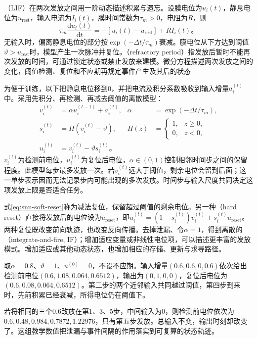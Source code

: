 （LIF）在两次发放之间用一阶动态描述积累与遗忘。设膜电位为$u_i(t)$，静息电位为$u_{\mathrm{rest}}$，输入电流为$I_i(t)$，膜时间常数为$\tau_m>0$，电阻为$R$，则
\begin{equation}
  \tau_m\frac{\mathrm d u_i(t)}{\mathrm d t}
  =-[u_i(t)-u_{\mathrm{rest}}]+RI_i(t)\text{。}
  \label{eq:snn-continuous-lif}
\end{equation}
无输入时，偏离静息电位的部分按$\exp(-\Delta t/\tau_m)$衰减。膜电位从下方达到阈值$\vartheta>u_{\mathrm{rest}}$时，模型产生一次脉冲并复位。（refractory period）指发放后暂时不能再次发放的时间，可通过锁定状态或禁止发放来建模。微分方程描述两次发放之间的变化，阈值检测、复位和不应期再规定事件产生及其后的状态

为便于训练，以下把静息电位移到0，并把电流及积分系数吸收到输入增量$a_i^{(t)}$中。采用先积分、再检测、再减去阈值的离散模型：
\begin{align}
  v_i^{(t)}&=\alpha u_i^{(t-1)}+a_i^{(t)},
  &\alpha&=\exp(-\Delta t/\tau_m),\label{eq:snn-discrete-integrate}\\
  s_i^{(t)}&=H(v_i^{(t)}-\vartheta),
  &H(z)&=\begin{cases}1,&z\geq0,\\0,&z<0,\end{cases}
  \label{eq:snn-discrete-fire}\\
  u_i^{(t)}&=v_i^{(t)}-\vartheta s_i^{(t)}\text{。}
  \label{eq:snn-soft-reset}
\end{align}
$v_i^{(t)}$为检测前电位，$u_i^{(t)}$为复位后电位，$\alpha\in(0,1)$控制相邻时间步之间的保留程度。此模型每步最多发放一次。若$v_i^{(t)}$远大于阈值，剩余电位会留到后面；这一单步表示因而无法记录步内可能出现的多次发放。时间步与输入尺度共同决定这项发放上限是否适合任务。

式\eqref{eq:snn-soft-reset}称为减法复位，保留超过阈值的剩余电位。另一种（hard reset）直接将发放后的电位设为$u_{\mathrm{reset}}$，即$u_i^{(t)}=(1-s_i^{(t)})v_i^{(t)}+s_i^{(t)}u_{\mathrm{reset}}$。两种复位既改变前向轨迹，也改变反向传播。去掉泄漏、令$\alpha=1$，得到离散的（integrate-and-fire, IF）；增加适应变量或非线性电位项，可以描述更丰富的发放模式。增加适应或其他动态状态，也增加相应的存储、更新与求导路径。

\begin{example}[相同输入在不同间隔下的结果]
  \label{ex:snn-integration}
  取$\alpha=0.8$、$\vartheta=1$、$u^{(0)}=0$，不设不应期。输入增量$(0.6,0.6,0,0.6)$依次给出检测前电位$(0.6,1.08,0.064,0.6512)$，输出为$(0,1,0,0)$，复位后电位为$(0.6,0.08,0.064,0.6512)$。第二步的两个近邻输入共同越过阈值，第四步到来时，先前积累已经衰减，所得电位仍在阈值下。

  若将相同的三个$0.6$改放在第1、3、5步，中间输入为0，则检测前电位依次为$0.6,0.48,0.984,0.7872,1.22976$，只有第五步发放。总输入不变，输出时刻却改变了。这组教学数值把泄漏与事件间隔的作用落实到可复算的状态轨迹。
\end{example}

